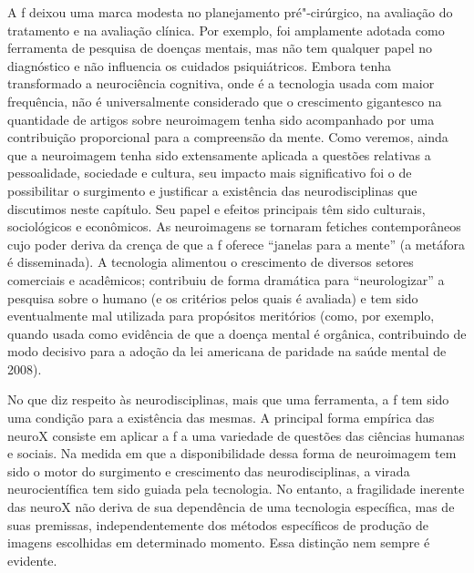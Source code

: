 A f deixou uma marca modesta no planejamento pré"-cirúrgico, na
avaliação do tratamento e na avaliação clínica. Por exemplo, foi
amplamente adotada como ferramenta de pesquisa de doenças mentais,
mas não tem qualquer papel no diagnóstico e não influencia os cuidados
psiquiátricos. Embora tenha transformado a neurociência cognitiva, onde
é a tecnologia usada com maior frequência, não é universalmente
considerado que o crescimento gigantesco na quantidade de artigos sobre
neuroimagem tenha sido acompanhado por uma contribuição proporcional
para a compreensão da mente. Como veremos, ainda que a neuroimagem tenha
sido extensamente aplicada a questões relativas a pessoalidade,
sociedade e cultura, seu impacto mais significativo foi o de
possibilitar o surgimento e justificar a existência das neurodisciplinas
que discutimos neste capítulo. Seu papel e efeitos principais têm sido
culturais, sociológicos e econômicos. As neuroimagens se tornaram
fetiches contemporâneos cujo poder deriva da crença de que a f
oferece ``janelas para a mente'' (a metáfora é disseminada). A
tecnologia alimentou o crescimento de diversos setores comerciais e
acadêmicos; contribuiu de forma dramática para ``neurologizar'' a
pesquisa sobre o humano (e os critérios pelos quais é avaliada) e tem
sido eventualmente mal utilizada para propósitos meritórios (como, por
exemplo, quando usada como evidência de que a doença mental é orgânica,
contribuindo de modo decisivo para a adoção da lei americana de paridade
na saúde mental de 2008).

No que diz respeito às neurodisciplinas, mais que uma ferramenta, a f
tem sido uma condição para a existência das mesmas. A principal forma
empírica das neuroX consiste em aplicar a f a uma variedade de questões
das ciências humanas e sociais. Na medida em que a disponibilidade dessa
forma de neuroimagem tem sido o motor do surgimento e crescimento das
neurodisciplinas, a virada neurocientífica tem sido guiada pela
tecnologia. No entanto, a fragilidade inerente das neuroX não deriva de
sua dependência de uma tecnologia específica, mas de suas premissas,
independentemente dos métodos específicos de produção de imagens
escolhidas em determinado momento. Essa distinção nem sempre é evidente.

